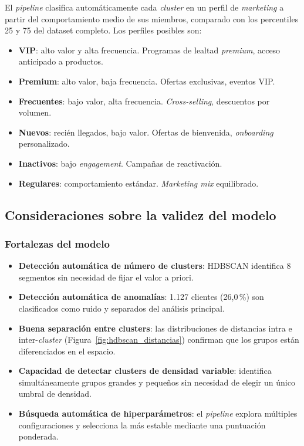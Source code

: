 \documentclass[11pt,a4paper]{article}
\begin{document}
El \textit{pipeline} clasifica automáticamente cada \textit{cluster} en un perfil de \textit{marketing} a partir del comportamiento medio de sus miembros, comparado con los percentiles 25 y 75 del dataset completo. Los perfiles posibles son:

\begin{itemize}
    \item \textbf{VIP}: alto valor y alta frecuencia. Programas de lealtad \textit{premium}, acceso anticipado a productos.
    \item \textbf{Premium}: alto valor, baja frecuencia. Ofertas exclusivas, eventos VIP.
    \item \textbf{Frecuentes}: bajo valor, alta frecuencia. \textit{Cross-selling}, descuentos por volumen.
    \item \textbf{Nuevos}: recién llegados, bajo valor. Ofertas de bienvenida, \textit{onboarding} personalizado.
    \item \textbf{Inactivos}: bajo \textit{engagement}. Campañas de reactivación.
    \item \textbf{Regulares}: comportamiento estándar. \textit{Marketing mix} equilibrado.
\end{itemize}

\subsection{Consideraciones sobre la validez del modelo}

\subsubsection{Fortalezas del modelo}

\begin{itemize}
    \item \textbf{Detección automática de número de clusters}: HDBSCAN identifica 8 segmentos sin necesidad de fijar el valor a priori.
    \item \textbf{Detección automática de anomalías}: 1.127 clientes (26,0\,\%) son clasificados como ruido y separados del análisis principal.
    \item \textbf{Buena separación entre clusters}: las distribuciones de distancias intra e inter-\textit{cluster} (Figura~\ref{fig:hdbscan_distancias}) confirman que los grupos están diferenciados en el espacio.
    \item \textbf{Capacidad de detectar clusters de densidad variable}: identifica simultáneamente grupos grandes y pequeños sin necesidad de elegir un único umbral de densidad.
    \item \textbf{Búsqueda automática de hiperparámetros}: el \textit{pipeline} explora múltiples configuraciones y selecciona la más estable mediante una puntuación ponderada.
\end{itemize}
\end{document}
